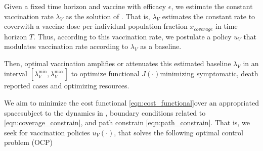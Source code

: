 Given a fixed time horizon and vaccine with efficacy $\epsilon$,
we estimate the constant vaccination rate $\lambda_V$ as the solution
of . That is, $\lambda_V$ estimates the constant rate
to cover\textemdash with a vaccine dose per individual\textemdash
population fraction $x_{coverage}$ in time horizon $T$. Thus, according to this
vaccination rate, we postulate a policy $u_V$ that modulates vaccination rate
according to $\lambda_V$ as a baseline.

Then, optimal vaccination amplifies or attenuates this estimated
baseline $\lambda_V$ in an interval $[\lambda_V^{\min}, \lambda_V^{\max}]$
to optimize functional $J(\cdot)$\textemdash minimizing symptomatic, death
reported cases and optimizing resources.

We aim to minimize the cost functional
\eqref{eqn:cost_functional}\textemdash over an appropriated
space\textemdash subject to the dynamics in
, boundary conditions
related to
\eqref{eqn:coverage_constrain}, and path
constrain \eqref{eqn:path_constrain}.
That is, we seek for vaccination policies $u_V(\cdot)$, that
solves the following optimal control problem
(OCP)%
